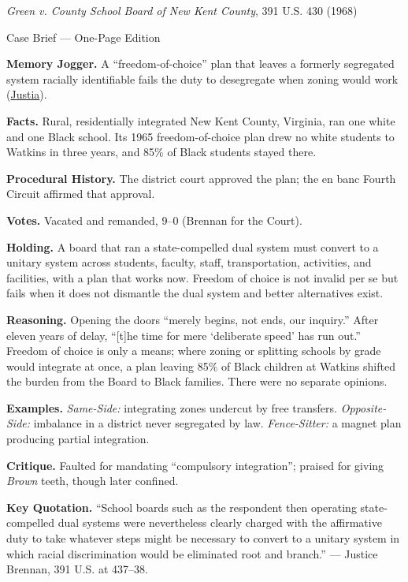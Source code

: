 \documentclass[12pt]{article}
\begin{document}
\begin{center}
{\Large \textit{Green v. County School Board of New Kent County}, 391 U.S. 430 (1968)\par}
\vspace{0.3em}
{\normalsize Case Brief --- One-Page Edition\par}
\end{center}

\textbf{Memory Jogger.} A ``freedom-of-choice'' plan that leaves a formerly segregated system racially identifiable fails the duty to desegregate when zoning would work (\href{https://supreme.justia.com/cases/federal/us/391/430/}{Justia}).

\textbf{Facts.} Rural, residentially integrated New Kent County, Virginia, ran one white and one Black school. Its 1965 freedom-of-choice plan drew no white students to Watkins in three years, and 85\% of Black students stayed there.

\textbf{Procedural History.} The district court approved the plan; the en banc Fourth Circuit affirmed that approval.

\textbf{Votes.} Vacated and remanded, 9--0 (Brennan for the Court).

\textbf{Holding.} A board that ran a state-compelled dual system must convert to a unitary system across students, faculty, staff, transportation, activities, and facilities, with a plan that works now. Freedom of choice is not invalid per se but fails when it does not dismantle the dual system and better alternatives exist.

\textbf{Reasoning.} Opening the doors ``merely begins, not ends, our inquiry.'' After eleven years of delay, ``[t]he time for mere `deliberate speed' has run out.'' Freedom of choice is only a means; where zoning or splitting schools by grade would integrate at once, a plan leaving 85\% of Black children at Watkins shifted the burden from the Board to Black families. There were no separate opinions.

\textbf{Examples.} \emph{Same-Side:} integrating zones undercut by free transfers. \emph{Opposite-Side:} imbalance in a district never segregated by law. \emph{Fence-Sitter:} a magnet plan producing partial integration.

\textbf{Critique.} Faulted for mandating ``compulsory integration''; praised for giving \textit{Brown} teeth, though later confined.

\textbf{Key Quotation.} ``School boards such as the respondent then operating state-compelled dual systems were nevertheless clearly charged with the affirmative duty to take whatever steps might be necessary to convert to a unitary system in which racial discrimination would be eliminated root and branch.'' --- Justice Brennan, 391 U.S. at 437--38.
\end{document}
